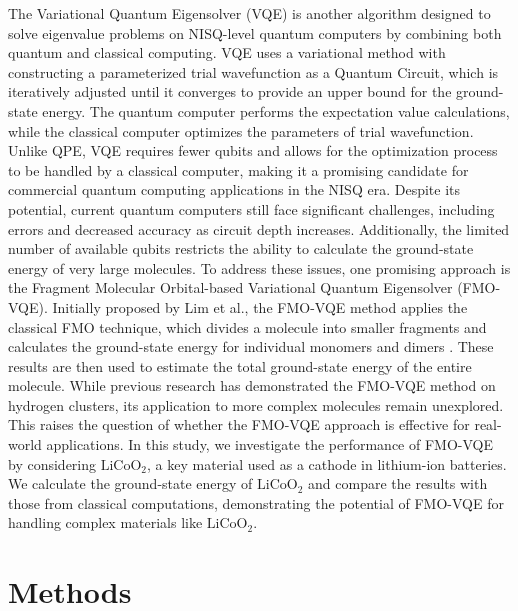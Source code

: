 \documentclass[pdflatex,sn-mathphys-num]{sn-jnl}%
\theoremstyle{thmstyleone}%
\theoremstyle{thmstyletwo}%
\theoremstyle{thmstylethree}%
\begin{document}
The Variational Quantum Eigensolver (VQE) is another algorithm designed to solve eigenvalue problems on NISQ-level quantum computers by combining both quantum and classical computing\cite{VQE1,VQE2,VQE3,VQE4}. VQE uses a variational method with constructing a parameterized trial wavefunction as a Quantum Circuit, which is iteratively adjusted until it converges to provide an upper bound for the ground-state energy. The quantum computer performs the expectation value calculations, while the classical computer optimizes the parameters of trial wavefunction. Unlike QPE, VQE requires fewer qubits and allows for the optimization process to be handled by a classical computer, making it a promising candidate for commercial quantum computing applications in the NISQ era\cite{VQEAPL1,VQEAPL2,VQEAPL3,VQEAPL4}. Despite its potential, current quantum computers still face significant challenges, including errors and decreased accuracy as circuit depth increases. Additionally, the limited number of available qubits restricts the ability to calculate the ground-state energy of very large molecules. To address these issues, one promising approach is the Fragment Molecular Orbital-based Variational Quantum Eigensolver (FMO-VQE). Initially proposed by Lim et al.\cite{FMOVQE}, the FMO-VQE method applies the classical FMO technique, which divides a molecule into smaller fragments and calculates the ground-state energy for individual monomers and dimers \cite{FMO1,FMO2,FMO3,FMO4}. These results are then used to estimate the total ground-state energy of the entire molecule. While previous research has demonstrated the FMO-VQE method on hydrogen clusters, its application to more complex molecules remain unexplored. This raises the question of whether the FMO-VQE approach is effective for real-world applications. In this study, we investigate the performance of FMO-VQE by considering \(\mathrm{LiCoO_2}\), a key material used as a cathode in lithium-ion batteries. We calculate the ground-state energy of \(\mathrm{LiCoO_2}\) and compare the results with those from classical computations, demonstrating the potential of FMO-VQE for handling complex materials like \(\mathrm{LiCoO_2}\).

\section{Methods}\label{sec2}
\end{document}

